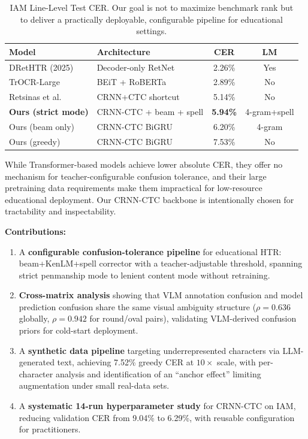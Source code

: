 \documentclass[conference]{IEEEtran}
\begin{document}
\begin{table}[h]
\centering
\caption{IAM Line-Level Test CER. Our goal is not to maximize benchmark rank but to deliver a practically deployable, configurable pipeline for educational settings.}
\label{tab:sota}
\begin{tabular}{@{}llcc@{}}
\toprule
\textbf{Model} & \textbf{Architecture} & \textbf{CER} & \textbf{LM} \\
\midrule
DRetHTR (2025)          & Decoder-only RetNet  & 2.26\% & Yes    \\
TrOCR-Large~\cite{li2021} & BEiT + RoBERTa    & 2.89\% & No     \\
Retsinas et al.~\cite{retsinas2022} & CRNN+CTC shortcut & 5.14\% & No \\
\textbf{Ours (strict mode)}   & CRNN-CTC + beam + spell & \textbf{5.94\%} & 4-gram+spell \\
Ours (beam only)        & CRNN-CTC BiGRU       & 6.20\% & 4-gram \\
Ours (greedy)           & CRNN-CTC BiGRU       & 7.53\% & No     \\
\bottomrule
\end{tabular}
\end{table}

While Transformer-based models achieve lower absolute CER, they offer no mechanism for teacher-configurable confusion tolerance, and their large pretraining data requirements make them impractical for low-resource educational deployment. Our CRNN-CTC backbone is intentionally chosen for tractability and inspectability.

\noindent\textbf{Contributions:}
\begin{enumerate}
  \item A \textbf{configurable confusion-tolerance pipeline} for educational HTR: beam+KenLM+spell corrector with a teacher-adjustable threshold, spanning strict penmanship mode to lenient content mode without retraining.
  \item \textbf{Cross-matrix analysis} showing that VLM annotation confusion and model prediction confusion share the same visual ambiguity structure ($\rho=0.636$ globally, $\rho=0.942$ for round/oval pairs), validating VLM-derived confusion priors for cold-start deployment.
  \item A \textbf{synthetic data pipeline} targeting underrepresented characters via LLM-generated text, achieving 7.52\% greedy CER at $10\times$ scale, with per-character analysis and identification of an ``anchor effect'' limiting augmentation under small real-data sets.
  \item A \textbf{systematic 14-run hyperparameter study} for CRNN-CTC on IAM, reducing validation CER from 9.04\% to 6.29\%, with reusable configuration for practitioners.
\end{enumerate}
\end{document}
